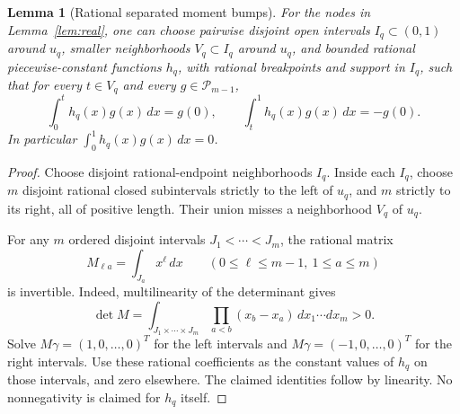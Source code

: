 \documentclass[11pt]{article}
\newtheorem{lemma}[theorem]{Lemma}
\newcommand{\PP}{\mathcal P}
\begin{document}
\begin{lemma}[Rational separated moment bumps]\label{lem:bumps}
For the nodes in Lemma~\ref{lem:real}, one can choose pairwise disjoint open
intervals $I_q\subset(0,1)$ around $u_q$, smaller neighborhoods
$V_q\subset I_q$ around $u_q$, and bounded rational piecewise-constant
functions $h_q$, with rational breakpoints and support in $I_q$, such that
for every $t\in V_q$ and every $g\in\PP_{m-1}$,
\[
 \int_0^t h_q(x)g(x)\,dx=g(0),\qquad
 \int_t^1 h_q(x)g(x)\,dx=-g(0).
\]
In particular $\int_0^1h_q(x)g(x)\,dx=0$.
\end{lemma}
\begin{proof}
Choose disjoint rational-endpoint neighborhoods $I_q$. Inside each $I_q$,
choose $m$ disjoint rational closed subintervals strictly to the left of
$u_q$, and $m$ strictly to its right, all of positive length. Their union
misses a neighborhood $V_q$ of $u_q$.

For any $m$ ordered disjoint intervals $J_1<\cdots<J_m$, the rational
matrix
\[
 M_{\ell a}=\int_{J_a}x^\ell\,dx\qquad
 (0\le\ell\le m-1,\ 1\le a\le m)
\]
is invertible. Indeed, multilinearity of the determinant gives
\[
 \det M=\int_{J_1\times\cdots\times J_m}
         \prod_{a<b}(x_b-x_a)\,dx_1\cdots dx_m>0.
\]
Solve $M\gamma=(1,0,\ldots,0)^T$ for the left intervals and
$M\gamma=(-1,0,\ldots,0)^T$ for the right intervals. Use these rational
coefficients as the constant values of $h_q$ on those intervals, and zero
elsewhere. The claimed identities follow by linearity. No nonnegativity
is claimed for $h_q$ itself.
\end{proof}
\end{document}
